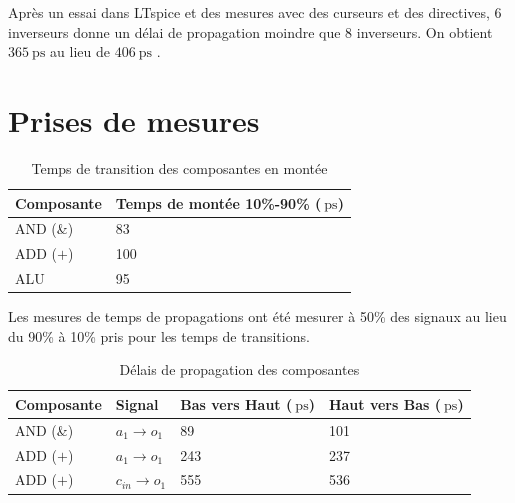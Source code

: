 \documentclass[a11paper]{article}
\newcommand{\quicktab}[4]{
  \begin{table}[H]
    \centering
    \caption{#1}
    \label{tab:#2}
    \begin{tabular}{#3}
      #4
    \end{tabular}
  \end{table}
}
\begin{document}
Après un essai dans LTspice et des mesures avec des curseurs et des directives,
6 inverseurs donne un délai de propagation moindre que 8 inverseurs. On obtient
$\SI{365}{\pico\s}$ au lieu de $\SI{406}{\pico\s}$ .

\section{Prises de mesures}

\quicktab{Temps de transition des composantes en montée}{ttLH-Sortie}{ll}{
\toprule
Composante & Temps de montée 10\%-90\% ($\SI{}{\pico\s}$) \\
\midrule
AND (\&) & 83 \\
ADD ($+$) & 100 \\ %
ALU & 95 \\
\bottomrule
}

Les mesures de temps de propagations ont été mesurer à 50\% des signaux au lieu
du 90\% à 10\% pris pour les temps de transitions.

\quicktab{Délais de propagation des composantes}{propagation}{llll}{
\toprule
Composante & Signal & Bas vers Haut ($\SI{}{\pico\s}$) & Haut vers Bas ($\SI{}{\pico\s}$) \\
\midrule
AND (\&) & $a_1 \rightarrow o_1$ & 89 & 101 \\
ADD ($+$) & $a_1 \rightarrow o_1$ & 243 & 237 \\
ADD ($+$) & $c_{in} \rightarrow o_1$ & 555 & 536 \\
\bottomrule
}


\end{document}
